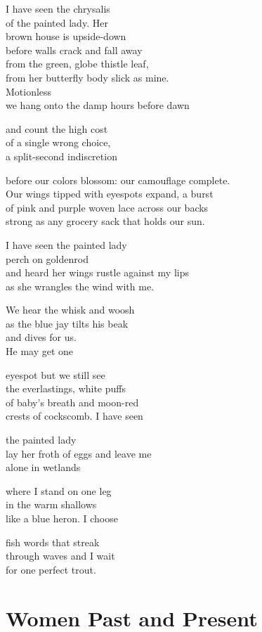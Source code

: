 \documentclass[twoside,10pt]{book}
\begin{document}
I have seen the chrysalis\\
of the painted lady. Her\\
brown house is upside-down\\
before walls crack and fall away\\
from the green, globe thistle leaf,\\
from her butterfly body slick as mine.\\
Motionless\\
we hang onto the damp hours before dawn

and count the high cost\\
of a single wrong choice,\\
a split-second indiscretion

before our colors blossom: our camouflage complete.\\
Our wings tipped with eyespots expand, a burst\\
of pink and purple woven lace across our backs\\
strong as any grocery sack that holds our sun.

I have seen the painted lady\\
perch on goldenrod\\
and heard her wings rustle against my lips\\
as she wrangles the wind with me.

We hear the whisk and woosh\\
as the blue jay tilts his beak\\
and dives for us.\\
He may get one

eyespot but we still see\\
the everlastings, white puffs\\
of baby's breath and moon-red\\
crests of cockscomb. I have seen

the painted lady\\
lay her froth of eggs and leave me\\
alone in wetlands

\clearpage
where I stand on one leg\\
in the warm shallows\\
like a blue heron. I choose

fish words that streak\\
through waves and I wait\\
for one perfect trout.


\clearpage
\section{Women Past and Present}
\end{document}
